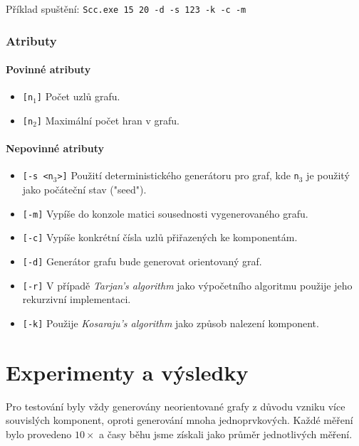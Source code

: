 \documentclass[12pt]{article}
\begin{document}
Příklad spuštění: \texttt{Scc.exe 15 20 -d -s 123 -k -c -m}

\subsubsection{Atributy}

\paragraph{Povinné atributy}
\begin{itemize}
\setlength\itemsep{1px}
\renewcommand\labelitemi{--}
\item{\texttt{[n$_1$]}} Počet uzlů grafu.
\item{\texttt{[n$_2$]}} Maximální počet hran v grafu.
\end{itemize}

\paragraph{Nepovinné atributy}
\begin{itemize}
\setlength\itemsep{1px}
\renewcommand\labelitemi{--}
\item{\texttt{[-s <n$_3$>]}} Použití deterministického generátoru pro graf, kde \texttt{n$_3$} je použitý jako počáteční stav ("seed").
\item{\texttt{[-m]}} Vypíše do konzole matici sousednosti vygenerovaného grafu.
\item{\texttt{[-c]}} Vypíše konkrétní čísla uzlů přiřazených ke komponentám.
\item{\texttt{[-d]}} Generátor grafu bude generovat orientovaný graf.
\item{\texttt{[-r]}} V případě \textit{Tarjan's algorithm} jako výpočetního algoritmu použije jeho rekurzivní implementaci.
\item{\texttt{[-k]}} Použije \textit{Kosaraju's algorithm} jako způsob nalezení komponent.
\end{itemize}

\section{Experimenty a výsledky}
\label{exp_results}
Pro testování byly vždy generovány neorientované grafy z důvodu vzniku více souvislých komponent, oproti generování mnoha jednoprvkových. Každé měření bylo provedeno $10\times$ a časy běhu jsme získali jako průměr jednotlivých měření.
\end{document}
